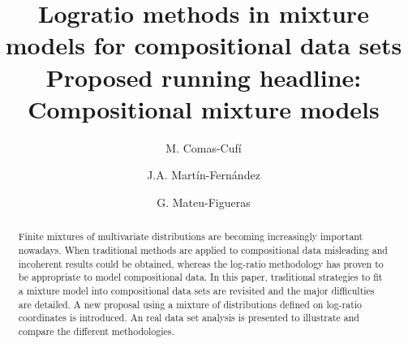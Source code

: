 \documentclass[12pt, a4paper]{article}
\title{Logratio methods in mixture models for compositional data sets \\ {\large Proposed running headline: Compositional mixture models} }
\author[1]{M. Comas-Cufí}%
\author[1]{J.A. Martín-Fernández}
\author[1]{G. Mateu-Figueras}
\affil[1]{\small Department of Computer Science, Applied Mathematics and Statistics, Universitat de Girona}
\theoremstyle{definition}
\begin{document}
\maketitle

\newpage



\providecommand{\keywords}[1]{\textbf{Key words:} #1}
\providecommand{\msc}[1]{\textbf{MSC2010:} #1}

\begin{abstract}
Finite mixtures of multivariate distributions are becoming increasingly important nowadays. When traditional methods are applied to compositional data misleading and incoherent results could be obtained, whereas the log-ratio methodology has proven to be appropriate to model compositional data. In this paper, traditional strategies to fit a mixture model into compositional data sets are revisited and the major difficulties are detailed. A new proposal using a mixture of distributions defined on log-ratio coordinates is introduced. An real data set analysis is presented to illustrate and compare the different methodologies.

\end{abstract}
\end{document}
